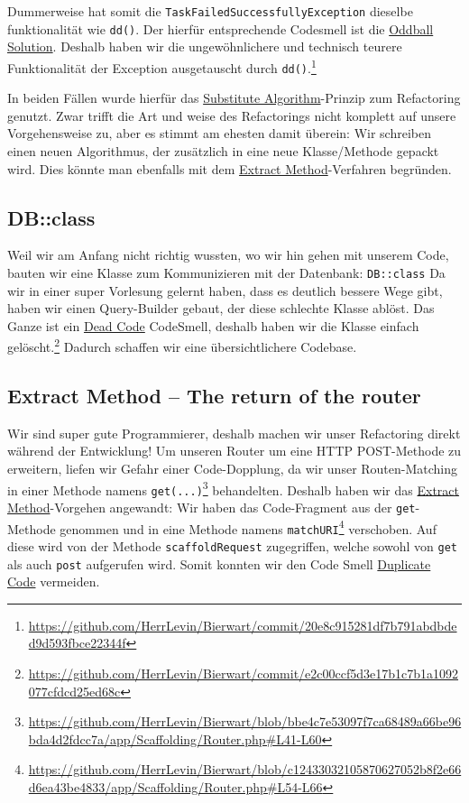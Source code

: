 \documentclass[12pt,a4paper,titlepage,ngerman,pdftex]{report}
\begin{document}
    Dummerweise hat somit die \verb|TaskFailedSuccessfullyException| dieselbe funktionalität wie \verb|dd()|.
    Der hierfür entsprechende Codesmell ist die \href{https://pragmaticways.com/31-code-smells-you-must-know/#6_Oddball_Solution}{Oddball Solution}.
    Deshalb haben wir die ungewöhnlichere und technisch teurere Funktionalität der Exception ausgetauscht durch \verb|dd()|.\footnote{\url{https://github.com/HerrLevin/Bierwart/commit/20e8c915281df7b791abdbded9d593fbce22344f}}

    In beiden Fällen wurde hierfür das \href{https://refactoring.guru/substitute-algorithm}{Substitute Algorithm}-Prinzip zum Refactoring genutzt.
    Zwar trifft die Art und weise des Refactorings nicht komplett auf unsere Vorgehensweise zu, aber es stimmt am ehesten damit überein:
    Wir schreiben einen neuen \glqq Algorithmus\grqq{}, der zusätzlich in eine neue Klasse/Methode gepackt wird.
    Dies könnte man ebenfalls mit dem \href{https://refactoring.guru/extract-method}{Extract Method}-Verfahren begründen.

    \subsection{DB::class}\label{subsec:db::class}
    Weil wir am Anfang nicht richtig wussten, wo wir hin gehen mit unserem Code, bauten wir eine Klasse zum Kommunizieren mit der Datenbank: \verb|DB::class|
    Da wir in einer super Vorlesung gelernt haben, dass es deutlich bessere Wege gibt, haben wir einen Query-Builder gebaut, der diese schlechte Klasse ablöst.
    Das Ganze ist ein \href{https://refactoring.guru/smells/dead-code}{Dead Code} CodeSmell, deshalb haben wir die Klasse einfach gelöscht.\footnote{\url{https://github.com/HerrLevin/Bierwart/commit/e2c00ccf5d3e17b1c7b1a1092077cfdcd25ed68c}}
    Dadurch schaffen wir eine übersichtlichere Codebase.
    
    \subsection{Extract Method -- The return of the router}\label{subsec:extract}
    Wir sind super gute Programmierer, deshalb machen wir unser Refactoring direkt während der Entwicklung!
    Um unseren Router um eine HTTP POST-Methode zu erweitern, liefen wir Gefahr einer Code-Dopplung, da wir unser Routen-Matching in einer Methode namens \verb|get(...)|\footnote{\url{https://github.com/HerrLevin/Bierwart/blob/bbe4c7e53097f7ca68489a66be96bda4d2fdcc7a/app/Scaffolding/Router.php#L41-L60}} behandelten.
    Deshalb haben wir das \href{https://refactoring.guru/extract-method}{Extract Method}-Vorgehen angewandt:
    Wir haben das Code-Fragment aus der \verb|get|-Methode genommen und in eine Methode namens \verb|matchURI|\footnote{\url{https://github.com/HerrLevin/Bierwart/blob/c12433032105870627052b8f2e66d6ea43be4833/app/Scaffolding/Router.php#L54-L66}} verschoben.
    Auf diese wird von der Methode \verb|scaffoldRequest| zugegriffen, welche sowohl von \verb|get| als auch \verb|post| aufgerufen wird.
    Somit konnten wir den Code Smell \href{https://refactoring.guru/smells/duplicate-code}{Duplicate Code} vermeiden.
\end{document}
